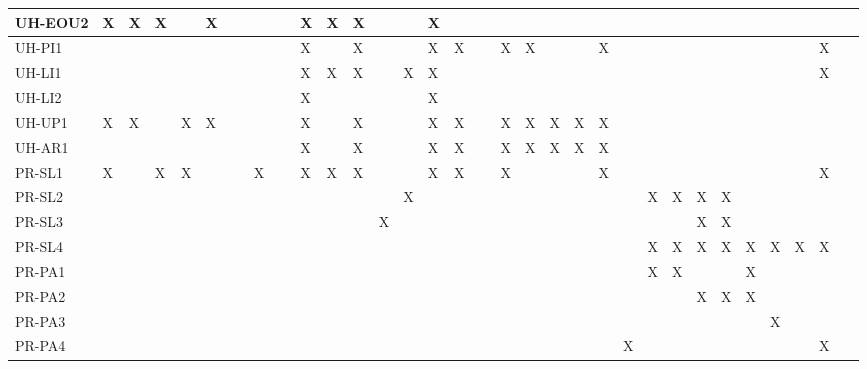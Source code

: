 \documentclass[12pt]{article}
\begin{document}
\begin{table}[H]
{\begin{tabular}{|l|l|l|l|l|l|l|l|l|l|l|l|l|l|l|l|l|l|l|l|l|l|l|l|l|l|l|l|l|l|l|l|}
      UH-EOU2 & X & X & X & ~ & X & ~ & ~ & ~ & X & X & X & ~ & ~ & X & ~ & ~ & ~ & ~ & ~ & ~ & ~ & ~ & ~ & ~ & ~ & ~ & ~ & ~ & ~ & ~ & ~ \\ \hline
      UH-PI1 & ~ & ~ & ~ & ~ & ~ & ~ & ~ & ~ & X & ~ & X & ~ & ~ & X & X & ~ & X & X & ~ & ~ & X & ~ & ~ & ~ & ~ & ~ & ~ & ~ & ~ & X & ~ \\ \hline
      UH-LI1 & ~ & ~ & ~ & ~ & ~ & ~ & ~ & ~ & X & X & X & ~ & X & X & ~ & ~ & ~ & ~ & ~ & ~ & ~ & ~ & ~ & ~ & ~ & ~ & ~ & ~ & ~ & X & ~ \\ \hline
      UH-LI2 & ~ & ~ & ~ & ~ & ~ & ~ & ~ & ~ & X & ~ & ~ & ~ & ~ & X & ~ & ~ & ~ & ~ & ~ & ~ & ~ & ~ & ~ & ~ & ~ & ~ & ~ & ~ & ~ & ~ & ~ \\ \hline
      UH-UP1 & X & X & ~ & X & X & ~ & ~ & ~ & X & ~ & X & ~ & ~ & X & X & ~ & X & X & X & X & X & ~ & ~ & ~ & ~ & ~ & ~ & ~ & ~ & ~ & ~ \\ \hline
      UH-AR1 & ~ & ~ & ~ & ~ & ~ & ~ & ~ & ~ & X & ~ & X & ~ & ~ & X & X & ~ & X & X & X & X & X & ~ & ~ & ~ & ~ & ~ & ~ & ~ & ~ & ~ & ~ \\ \hline
      PR-SL1 & X & ~ & X & X & ~ & ~ & X & ~ & X & X & X & ~ & ~ & X & X & ~ & X & ~ & ~ & ~ & X & ~ & ~ & ~ & ~ & ~ & ~ & ~ & ~ & X & ~ \\ \hline
      PR-SL2 & ~ & ~ & ~ & ~ & ~ & ~ & ~ & ~ & ~ & ~ & ~ & ~ & X & ~ & ~ & ~ & ~ & ~ & ~ & ~ & ~ & ~ & X & X & X & X & ~ & ~ & ~ & ~ & ~ \\ \hline
      PR-SL3 & ~ & ~ & ~ & ~ & ~ & ~ & ~ & ~ & ~ & ~ & ~ & X & ~ & ~ & ~ & ~ & ~ & ~ & ~ & ~ & ~ & ~ & ~ & ~ & X & X & ~ & ~ & ~ & ~ & ~ \\ \hline
      PR-SL4 & ~ & ~ & ~ & ~ & ~ & ~ & ~ & ~ & ~ & ~ & ~ & ~ & ~ & ~ & ~ & ~ & ~ & ~ & ~ & ~ & ~ & ~ & X & X & X & X & X & X & X & X & ~ \\ \hline
      PR-PA1 & ~ & ~ & ~ & ~ & ~ & ~ & ~ & ~ & ~ & ~ & ~ & ~ & ~ & ~ & ~ & ~ & ~ & ~ & ~ & ~ & ~ & ~ & X & X & ~ & ~ & X & ~ & ~ & ~ & ~ \\ \hline
      PR-PA2 & ~ & ~ & ~ & ~ & ~ & ~ & ~ & ~ & ~ & ~ & ~ & ~ & ~ & ~ & ~ & ~ & ~ & ~ & ~ & ~ & ~ & ~ & ~ & ~ & X & X & X & ~ & ~ & ~ & ~ \\ \hline
      PR-PA3 & ~ & ~ & ~ & ~ & ~ & ~ & ~ & ~ & ~ & ~ & ~ & ~ & ~ & ~ & ~ & ~ & ~ & ~ & ~ & ~ & ~ & ~ & ~ & ~ & ~ & ~ & ~ & X & ~ & ~ & ~ \\ \hline
      PR-PA4 & ~ & ~ & ~ & ~ & ~ & ~ & ~ & ~ & ~ & ~ & ~ & ~ & ~ & ~ & ~ & ~ & ~ & ~ & ~ & ~ & ~ & X & ~ & ~ & ~ & ~ & ~ & ~ & ~ & X & ~ \\ \hline

\end{tabular}}
\end{table}
\end{document}
